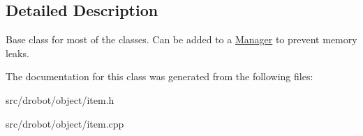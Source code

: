 \subsection{Detailed Description}
Base class for most of the classes. Can be added to a \hyperlink{classdrobot_1_1object_1_1Manager}{Manager} to prevent memory leaks. 

The documentation for this class was generated from the following files\-:\begin{DoxyCompactItemize}
\item 
src/drobot/object/item.\-h\item 
src/drobot/object/item.\-cpp\end{DoxyCompactItemize}
